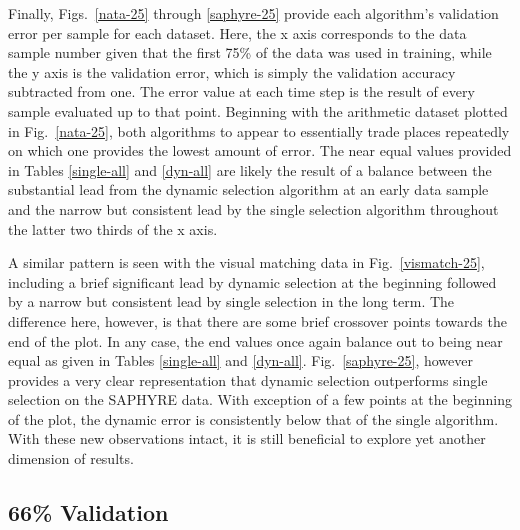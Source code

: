 \documentclass[12pt]{uthesis-v12}  %
\begin{document}
%						

Finally, Figs.~\ref{nata-25} through \ref{saphyre-25} provide each algorithm's validation error per sample for each dataset. Here, the x axis corresponds to the data sample number given that the first 75\% of the data was used in training, while the y axis is the validation error, which is simply the validation accuracy subtracted from one. The error value at each time step is the result of every sample evaluated up to that point. Beginning with the arithmetic dataset plotted in Fig.~\ref{nata-25}, both algorithms to appear to essentially trade places repeatedly on which one provides the lowest amount of error. The near equal values provided in Tables \ref{single-all} and \ref{dyn-all} are likely the result of a balance between the substantial lead from the dynamic selection algorithm at an early data sample and the narrow but consistent lead by the single selection algorithm throughout the latter two thirds of the x axis. 

A similar pattern is seen with the visual matching data in Fig.~\ref{vismatch-25}, including a brief significant lead by dynamic selection at the beginning followed by a narrow but consistent lead by single selection in the long term. The difference here, however, is that there are some brief crossover points towards the end of the plot. In any case, the end values once again balance out to being near equal as given in Tables \ref{single-all} and \ref{dyn-all}. Fig.~\ref{saphyre-25}, however provides a very clear representation that dynamic selection outperforms single selection on the SAPHYRE data. With exception of a few points at the beginning of the plot, the dynamic error is consistently below that of the single algorithm. With these new observations intact, it is still beneficial to explore yet another dimension of results.
	
\subsection{66\% Validation}
\end{document}
